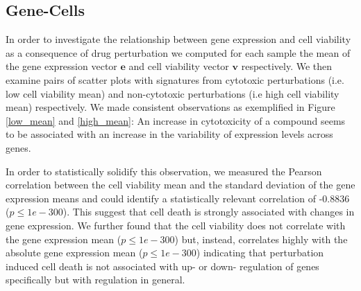 \documentclass[bsc,frontabs,twoside,singlespacing,parskip,deptreport]{infthesis}     %
\let\Oldsubsection\subsection
\renewcommand{\subsection}{\FloatBarrier\Oldsubsection}
\begin{document}
\subsection{Gene-Cells}
In order to investigate the relationship between gene expression and cell viability as a consequence of drug perturbation we computed for each sample the mean of the gene expression vector \(\mathbf{e}\) and cell viability vector \(\mathbf{v}\) respectively. We then examine pairs of scatter plots with signatures from cytotoxic perturbations (i.e. low cell viability mean) and non-cytotoxic perturbations (i.e high cell viability mean) respectively. We made consistent observations as exemplified in Figure \ref{low_mean} and \ref{high_mean}: An increase in cytotoxicity of a compound  seems to be associated with an increase in the variability of expression levels across genes.

In order to statistically solidify this observation, we  measured the Pearson correlation between the cell viability mean and the standard deviation of the gene expression means and could identify a statistically relevant correlation of -0.8836 (\(p\leq1e-300\)). This suggest that cell death is strongly associated with changes in gene expression.
We further found that the cell viability does not correlate with the gene expression mean (\(p\leq1e-300\)) but, instead, correlates highly with the absolute gene expression mean (\(p\leq1e-300\)) indicating that perturbation induced cell death is not associated with up- or down- regulation of genes specifically but with regulation in general. 
\end{document}
